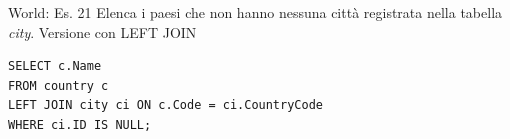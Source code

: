 \begin{frame}[fragile]{World: Es. 21}
Elenca i paesi che non hanno nessuna citt\`a registrata nella tabella \textit{city}.
\newline
\newline
Versione con LEFT JOIN
\begin{lstlisting}
SELECT c.Name
FROM country c
LEFT JOIN city ci ON c.Code = ci.CountryCode
WHERE ci.ID IS NULL;
\end{lstlisting}
\end{frame}

